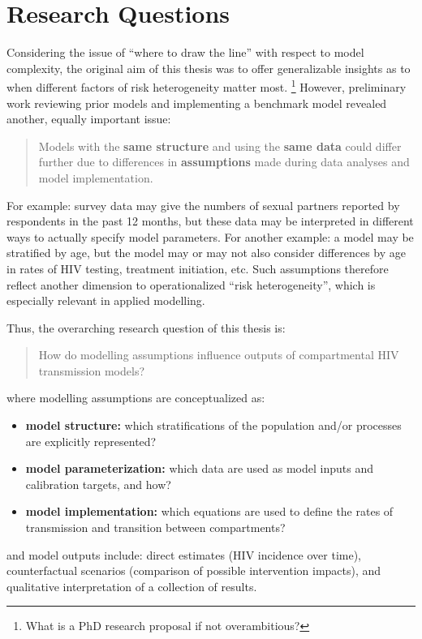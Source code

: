 \section{Research Questions}\label{intro.rqs}
Considering the issue of ``where to draw the line'' with respect to model complexity,
the original aim of this thesis was to offer generalizable insights as to
when different factors of risk heterogeneity matter most.%
\footnote{What is a PhD research proposal if not overambitious?}
However, preliminary work reviewing prior models and implementing a benchmark model
revealed another, equally important issue:
\begin{quote}
  Models with the \textbf{same structure} and using the \textbf{same data}
  could differ further due to differences in
  \textbf{assumptions} made during data analyses and model implementation.
\end{quote}
For example:
survey data may give the numbers of sexual partners reported by respondents in the past 12 months,
but these data may be interpreted in different ways to actually specify model parameters.
For another example:
a model may be stratified by age, but the model may or may not also consider
differences by age in rates of HIV testing, treatment initiation, etc.
Such assumptions therefore reflect another dimension to operationalized ``risk heterogeneity'',
which is especially relevant in applied modelling.
\par
Thus, the overarching research question of this thesis is:
\begin{quote}
  How do modelling assumptions influence outputs of compartmental HIV transmission models?
\end{quote}
where modelling assumptions are conceptualized as:
\begin{itemize}
  \item \textbf{model structure:} which
  stratifications of the population and/or processes are explicitly represented?
  \item \textbf{model parameterization:} which
  data are used as model inputs and calibration targets, and how?
  \item \textbf{model implementation:} which
  equations are used to define the rates of transmission and transition between compartments?
\end{itemize}
and model outputs include:
direct estimates (\eg HIV incidence over time),
counterfactual scenarios (\eg comparison of possible intervention impacts), and
qualitative interpretation of a collection of results.
